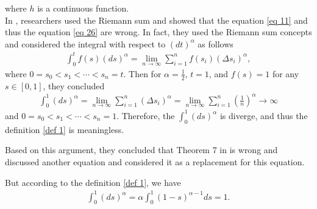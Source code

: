 \documentclass[a4paper,fleqn]{cas-dc}
\begin{document}
	where $h$ is a continuous function. \\
	In \cite{bib 1}, researchers used the Riemann sum and showed that the equation \eqref{eq 11} and thus the equation  \eqref{eq 26} are wrong. In fact, they used the Riemann sum concepts and considered the integral with respect to $(dt)^{\alpha}$ as follows 
	\begin{align}
		\int_0^t f(s) (ds)^{\alpha} = \underset{n \longrightarrow \infty}{\lim} \sum_{i=1}^n f(s_i) (\Delta s_i)^{\alpha},
	\end{align}
	where $0 = s_0 < s_1 < \cdots < s_n = t$. Then for $\alpha = \frac{1}{2}$, $t = 1$,  and $f(s) = 1$ for any $s \in [0, 1]$,  they concluded
	\begin{align}
		\int_0^1  (ds)^{\alpha} =  \underset{n \longrightarrow \infty}{\lim} \sum_{i=1}^n (\Delta s_i)^{\alpha}	= \underset{n \longrightarrow \infty}{\lim} \sum_{i=1}^n \left(\frac{1}{n}\right)^{\alpha} \longrightarrow  \infty
	\end{align}
	and $0 = s_0 < s_1 < \cdots < s_n = 1$. Therefore,  the $\int_0^1  (ds)^{\alpha}$ is diverge, and thus  the definition \ref{def 1}  is meaningless. 
	
	
	
	Based on this argument, they  concluded that Theorem 7 in \cite{bib 2} is wrong and discussed another equation and considered it as a replacement for this equation.
	
	
	
	
	
	
	But according to the definition \ref{def 1}, we have 
	\begin{align}
		\int_0^1  (ds)^{\alpha} = \alpha \int_0^1  (1 - s)^{\alpha -1} ds = 1. 
	\end{align}
	
	
	
	
	
	
	
	
	
	
	
	
	
	
	
	
	
\end{document}
